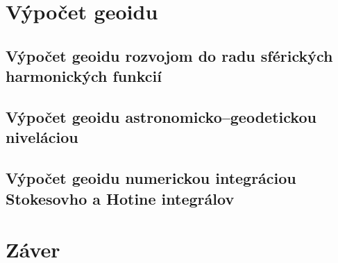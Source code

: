 \documentclass[a4paper, 12pt]{book}
\begin{document}







\chapter{Výpočet geoidu}
\label{sec:geoid_determination}







\section{Výpočet geoidu rozvojom do radu sférických harmonických funkcií}







\section{Výpočet geoidu astronomicko--geodetickou niveláciou}







\section{Výpočet geoidu numerickou integráciou Stokesovho a Hotine integrálov}







\chapter*{Záver}






\end{document}

